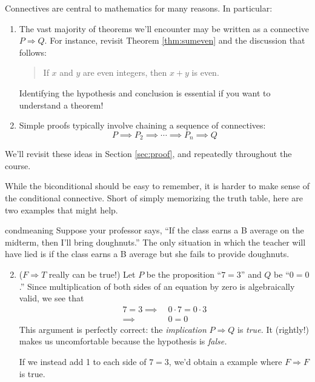 
Connectives are central to mathematics for many reasons. In particular:
\begin{enumerate}
  \item The vast majority of theorems we'll encounter may be written as a connective $P\Longrightarrow Q$. For instance, revisit Theorem \ref{thm:sumeven} and the discussion that follows:
  \begin{quote}
  	If $x$ and $y$ are even integers, then $x+y$ is even.
  \end{quote}
  Identifying the hypothesis and conclusion is essential if you want to understand a theorem!
  \item Simple proofs typically involve chaining a sequence of connectives:
  \[P\implies P_2\implies \cdots \implies P_n\implies Q\]
\end{enumerate}
We'll revisit these ideas in Section \ref{sec:proof}, and repeatedly throughout the course.\bigbreak


While the biconditional should be easy to remember, %
it is harder to make sense of the conditional connective. Short of simply memorizing the truth table, here are two examples that might help.

\begin{examples}{}{condmeaning}
	\exstart Suppose your professor says, ``If the class earns a B average on the midterm, then I'll bring doughnuts.'' The only situation in which the teacher will have lied is if the class earns a B average but she fails to provide doughnuts.
	\begin{enumerate}\setcounter{enumi}{1}
	  \item ($F\Longrightarrow T$ really can be true!) Let $P$ be the proposition ``$7=3$'' and $Q$ be ``$0=0$.'' Since multiplication of both sides of an equation by zero is algebraically valid, we see that
	  \begin{align*}
			7=3\implies\ &0\cdot 7=0\cdot 3\tag*{(If $7=3$, then 0 times 7 equals 0 times 3)}\\
			\implies\ &0=0\tag*{(then 0 equals 0)}
		\end{align*}
	  This argument is perfectly correct: the \emph{implication} $P\Longrightarrow Q$ is \emph{true.} It (rightly!) makes us uncomfortable because the hypothesis is \emph{false.}\par
	  If we instead add 1 to each side of $7=3$, we'd obtain a example where $F\Longrightarrow F$ is true.
	\end{enumerate}
\end{examples}


